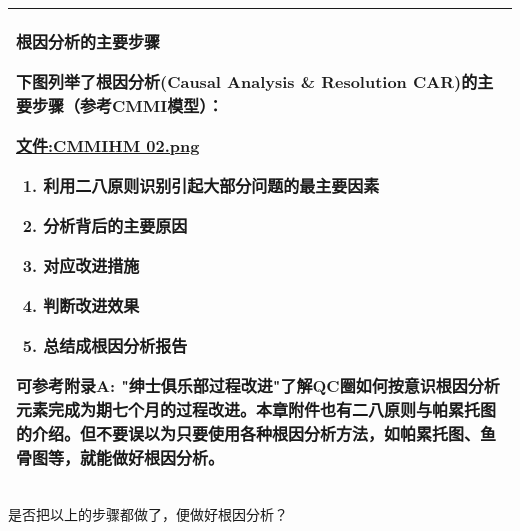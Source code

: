 \documentclass[]{article}
\date{}
\providecommand{\tightlist}{%
  \setlength{\itemsep}{0pt}\setlength{\parskip}{0pt}}
\begin{document}
\begin{longtable}[]{@{}l@{}}
\toprule
\endhead
\begin{minipage}[t]{0.97\columnwidth}\raggedright
根因分析的主要步骤

下图列举了根因分析(Causal Analysis \& Resolution
CAR)的主要步骤（参考CMMI模型）：

\href{文件:CMMIHM_02.png}{文件:CMMIHM 02.png}

\begin{enumerate}
\tightlist
\item
  利用二八原则识别引起大部分问题的最主要因素
\item
  分析背后的主要原因
\item
  对应改进措施
\item
  判断改进效果
\item
  总结成根因分析报告
\end{enumerate}

可参考附录A:
"绅士俱乐部过程改进"了解QC圈如何按意识根因分析元素完成为期七个月的过程改进。本章附件也有二八原则与帕累托图的介绍。但不要误以为只要使用各种根因分析方法，如帕累托图、鱼骨图等，就能做好根因分析。\strut
\end{minipage}\tabularnewline
\bottomrule
\end{longtable}

是否把以上的步骤都做了，便做好根因分析？
\end{document}

